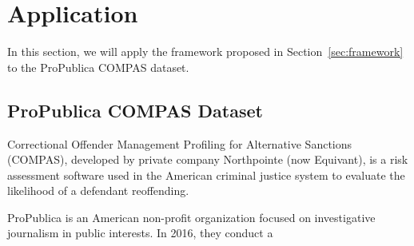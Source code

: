 \documentclass[conference]{IEEEtran}
\begin{document}
\section{Application}
\label{sec:app}
In this section, we will apply the framework proposed in Section~\ref{sec:framework} to the ProPublica COMPAS dataset.

\subsection{ProPublica COMPAS Dataset}
Correctional Offender Management Profiling for Alternative Sanctions (COMPAS), developed by private company Northpointe (now Equivant), is a risk assessment software used in the American criminal justice system to evaluate the likelihood of a defendant reoffending.

ProPublica is an American non-profit organization focused on investigative journalism in public interests. In 2016, they conduct a















\end{document}
